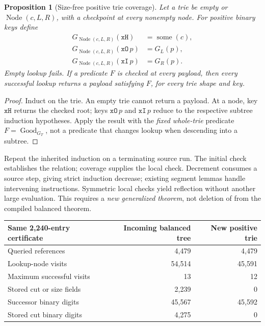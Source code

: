 \documentclass[11pt]{article}
\newtheorem{proposition}{Proposition}[section]
\newcommand{\file}[1]{{\small\path{#1}}}
\begin{document}
\begin{proposition}[Size-free positive trie coverage]
Let a trie be empty or $\operatorname{Node}(c,L,R)$, with a checkpoint at \emph{every} nonempty node. For positive binary keys define
\[
 \begin{aligned}
 G_{\operatorname{Node}(c,L,R)}(\mathtt{xH})&=\operatorname{some}(c),\\
 G_{\operatorname{Node}(c,L,R)}(\mathtt{xO}\,p)&=G_L(p),\\
 G_{\operatorname{Node}(c,L,R)}(\mathtt{xI}\,p)&=G_R(p).
 \end{aligned}
\]
Empty lookup fails. If a predicate $F$ is checked at every payload, then every successful lookup returns a payload satisfying $F$, for every trie shape and key.
\end{proposition}
\begin{proof}
Induct on the trie. An empty trie cannot return a payload. At a node, key $\mathtt{xH}$ returns the checked root; keys $\mathtt{xO}\,p$ and $\mathtt{xI}\,p$ reduce to the respective subtree induction hypotheses. Apply the result with the \emph{fixed whole-trie} predicate $F=\operatorname{Good}_{G_T}$, not a predicate that changes lookup when descending into a subtree.
\end{proof}

Repeat the inherited induction on a terminating source run. The initial check establishes the relation; coverage supplies the local check. Decrement consumes a source step, giving strict induction decrease; existing segment lemmas handle intervening instructions. Symmetric local checks yield reflection without another large evaluation. This requires a \emph{new generalized theorem}, not deletion of \file{validb} from the compiled balanced theorem.

\begin{center}\small
\renewcommand{\arraystretch}{1.12}
\begin{tabular}{lrr}
\toprule
Same 2,240-entry certificate & Incoming balanced tree & New positive trie\\\midrule
Queried references & 4,479 & 4,479\\
Lookup-node visits & 54,514 & 45,591\\
Maximum successful visits & 13 & 12\\
Stored cut or size fields & 2,239 & 0\\
Successor binary digits & 45,567 & 45,592\\
Stored cut binary digits & 4,275 & 0\\\bottomrule
\end{tabular}
\end{center}
\end{document}
